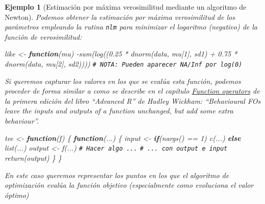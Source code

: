 \documentclass[
]{book}
\newenvironment{Shaded}{\begin{snugshade}}{\end{snugshade}}
\newcommand{\CommentTok}[1]{\textcolor[rgb]{0.56,0.35,0.01}{\textit{#1}}}
\newcommand{\ControlFlowTok}[1]{\textcolor[rgb]{0.13,0.29,0.53}{\textbf{#1}}}
\newcommand{\DecValTok}[1]{\textcolor[rgb]{0.00,0.00,0.81}{#1}}
\newcommand{\FloatTok}[1]{\textcolor[rgb]{0.00,0.00,0.81}{#1}}
\newcommand{\FunctionTok}[1]{\textcolor[rgb]{0.00,0.00,0.00}{#1}}
\newcommand{\NormalTok}[1]{#1}
\newcommand{\OtherTok}[1]{\textcolor[rgb]{0.56,0.35,0.01}{#1}}
\newcommand{\SpecialCharTok}[1]{\textcolor[rgb]{0.00,0.00,0.00}{#1}}
\theoremstyle{break}
\newtheorem{example}{Ejemplo}[chapter]
\theoremstyle{nonumberplain}
\renewcommand{\CommentTok}[1]{\textcolor[rgb]{0.41,0.41,0.41}{\texttt{#1}}}
\begin{document}
\begin{example}[Estimación por máxima verosimilitud mediante un algoritmo de Newton]
Podemos obtener la estimación por máxima verosimilitud de los parámetros empleando la rutina \texttt{nlm} para minimizar el logaritmo (negativo) de la función de verosimilitud:

\begin{Shaded}
\begin{Highlighting}[]
\NormalTok{like }\OtherTok{\textless{}{-}} \ControlFlowTok{function}\NormalTok{(mu)}
  \SpecialCharTok{{-}}\FunctionTok{sum}\NormalTok{(}\FunctionTok{log}\NormalTok{((}\FloatTok{0.25} \SpecialCharTok{*} \FunctionTok{dnorm}\NormalTok{(data, mu[}\DecValTok{1}\NormalTok{], sd1) }\SpecialCharTok{+} \FloatTok{0.75} \SpecialCharTok{*} \FunctionTok{dnorm}\NormalTok{(data, mu[}\DecValTok{2}\NormalTok{], sd2))))}
  \CommentTok{\# NOTA: Pueden aparecer NA/Inf por log(0)}
\end{Highlighting}
\end{Shaded}

Si queremos capturar los valores en los que se evalúa esta función, podemos proceder de forma similar a como se describe en el capítulo
\href{http://adv-r.had.co.nz/Function-operators.html\#behavioural-fos}{Function operators}
de la primera edición del libro ``Advanced R'' de Hadley Wickham:
``Behavioural FOs leave the inputs and outputs of a function unchanged,
but add some extra behaviour''.

\begin{Shaded}
\begin{Highlighting}[]
\NormalTok{tee }\OtherTok{\textless{}{-}} \ControlFlowTok{function}\NormalTok{(f) \{}
  \ControlFlowTok{function}\NormalTok{(...) \{}
\NormalTok{    input }\OtherTok{\textless{}{-}} \ControlFlowTok{if}\NormalTok{(}\FunctionTok{nargs}\NormalTok{() }\SpecialCharTok{==} \DecValTok{1}\NormalTok{) }\FunctionTok{c}\NormalTok{(...) }\ControlFlowTok{else} \FunctionTok{list}\NormalTok{(...)}
\NormalTok{    output }\OtherTok{\textless{}{-}} \FunctionTok{f}\NormalTok{(...)}
    \CommentTok{\# Hacer algo ...}
    \CommentTok{\# ... con output e input}
    \FunctionTok{return}\NormalTok{(output)}
\NormalTok{  \}}
\NormalTok{\}}
\end{Highlighting}
\end{Shaded}

En este caso queremos representar los puntos en los que el algoritmo de optimización evalúa la función objetivo (especialmente como evoluciona el valor óptimo)


\end{example}
\end{document}
